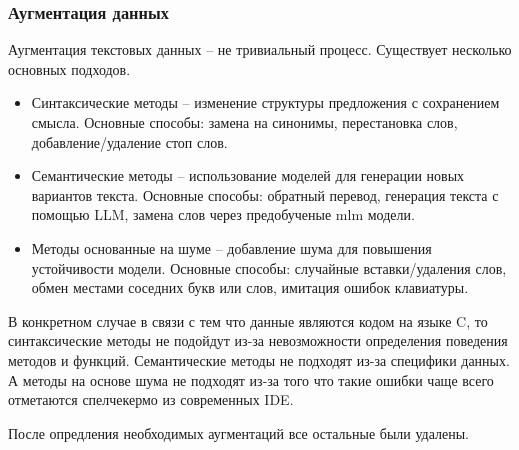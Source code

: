 \documentclass[../part_2.tex]{subfiles}
\begin{document}
    \subsubsection{Аугментация данных}
    \par Аугментация текстовых данных -- не тривиальный процесс. Существует несколько основных подходов.
    \begin{itemize}
        \item Синтаксические методы -- изменение структуры предложения с сохранением смысла. Основные способы: замена на синонимы, перестановка слов, добавление/удаление стоп слов.
        \item Семантические методы -- использование моделей для генерации новых вариантов текста. Основные способы: обратный перевод, генерация текста с помощью LLM, замена слов через предобученые \acrshort{mlm} модели.
        \item Методы основанные на шуме -- добавление шума для повышения устойчивости модели. Основные способы: случайные вставки/удаления слов, обмен местами соседних букв или слов, имитация ошибок клавиатуры.
    \end{itemize}
    \par В конкретном случае в связи с тем что данные являются кодом на языке C, то синтаксические методы не подойдут из-за невозможности определения поведения методов и функций. Семантические методы не подходят из-за специфики данных. А методы на основе шума не подходят из-за того что такие ошибки чаще всего отметаются спелчекермо из современных IDE.

    \par После опредления необходимых аугментаций все остальные были удалены.
\end{document}
